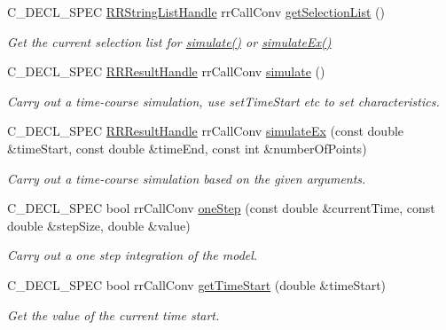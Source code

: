 \begin{DoxyCompactItemize}
\-C\-\_\-\-D\-E\-C\-L\-\_\-\-S\-P\-E\-C \hyperlink{rr__c__types_8h_abf561b014879247b7b92ee99c205de21}{\-R\-R\-String\-List\-Handle} \*
rr\-Call\-Conv \hyperlink{group__loadsave_ga1db0b86ed7fd0d6e19f8df85b7577253}{get\-Selection\-List} ()
\begin{DoxyCompactList}\small\item\em \-Get the current selection list for \hyperlink{group__simulation_ga9f0555c11716daec2336d54d13facc57}{simulate()} or \hyperlink{group__simulation_ga9b87919e79f6eb0d7c77c3daa08d6baf}{simulate\-Ex()} \end{DoxyCompactList}\item 
\-C\-\_\-\-D\-E\-C\-L\-\_\-\-S\-P\-E\-C \hyperlink{rr__c__types_8h_a8c364bbdef9aab31c89655c38461da51}{\-R\-R\-Result\-Handle} \*
rr\-Call\-Conv \hyperlink{group__loadsave_ga9f0555c11716daec2336d54d13facc57}{simulate} ()
\begin{DoxyCompactList}\small\item\em \-Carry out a time-\/course simulation, use set\-Time\-Start etc to set characteristics. \end{DoxyCompactList}\item 
\-C\-\_\-\-D\-E\-C\-L\-\_\-\-S\-P\-E\-C \hyperlink{rr__c__types_8h_a8c364bbdef9aab31c89655c38461da51}{\-R\-R\-Result\-Handle} \*
rr\-Call\-Conv \hyperlink{group__loadsave_ga9b87919e79f6eb0d7c77c3daa08d6baf}{simulate\-Ex} (const double \&time\-Start, const double \&time\-End, const int \&number\-Of\-Points)
\begin{DoxyCompactList}\small\item\em \-Carry out a time-\/course simulation based on the given arguments. \end{DoxyCompactList}\item 
\-C\-\_\-\-D\-E\-C\-L\-\_\-\-S\-P\-E\-C bool rr\-Call\-Conv \hyperlink{group__loadsave_ga190fff177accdfbc9c192c4993807e2e}{one\-Step} (const double \&current\-Time, const double \&step\-Size, double \&value)
\begin{DoxyCompactList}\small\item\em \-Carry out a one step integration of the model. \end{DoxyCompactList}\item 
\-C\-\_\-\-D\-E\-C\-L\-\_\-\-S\-P\-E\-C bool rr\-Call\-Conv \hyperlink{group__loadsave_ga18b4fbd0dc5aa3f25d58367a406f425c}{get\-Time\-Start} (double \&time\-Start)
\begin{DoxyCompactList}\small\item\em \-Get the value of the current time start. \end{DoxyCompactList}\item 

\end{DoxyCompactItemize}
